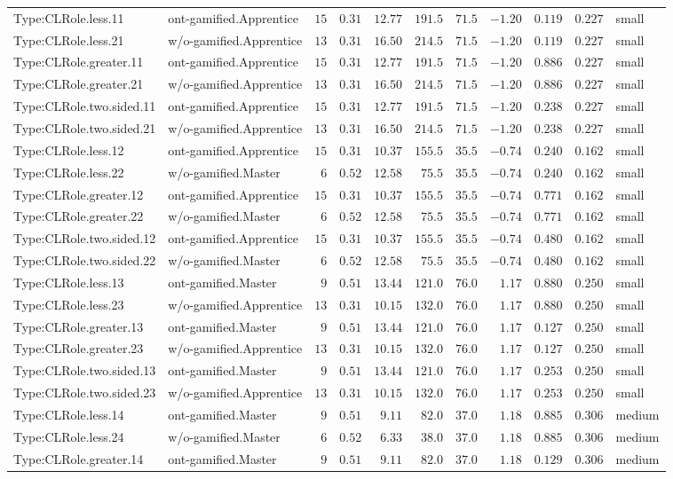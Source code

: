 \documentclass[6pt,a4paper]{article}
\begin{document}
{\begin{longtable}{llrrrrrrrrl}
Type:CLRole.less.11&ont-gamified.Apprentice&$15$&$0.31$&$12.77$&$191.5$&$ 71.5$&$-1.20$&$0.119$&$0.227$&small\tabularnewline
Type:CLRole.less.21&w/o-gamified.Apprentice&$13$&$0.31$&$16.50$&$214.5$&$ 71.5$&$-1.20$&$0.119$&$0.227$&small\tabularnewline
Type:CLRole.greater.11&ont-gamified.Apprentice&$15$&$0.31$&$12.77$&$191.5$&$ 71.5$&$-1.20$&$0.886$&$0.227$&small\tabularnewline
Type:CLRole.greater.21&w/o-gamified.Apprentice&$13$&$0.31$&$16.50$&$214.5$&$ 71.5$&$-1.20$&$0.886$&$0.227$&small\tabularnewline
Type:CLRole.two.sided.11&ont-gamified.Apprentice&$15$&$0.31$&$12.77$&$191.5$&$ 71.5$&$-1.20$&$0.238$&$0.227$&small\tabularnewline
Type:CLRole.two.sided.21&w/o-gamified.Apprentice&$13$&$0.31$&$16.50$&$214.5$&$ 71.5$&$-1.20$&$0.238$&$0.227$&small\tabularnewline
Type:CLRole.less.12&ont-gamified.Apprentice&$15$&$0.31$&$10.37$&$155.5$&$ 35.5$&$-0.74$&$0.240$&$0.162$&small\tabularnewline
Type:CLRole.less.22&w/o-gamified.Master&$ 6$&$0.52$&$12.58$&$ 75.5$&$ 35.5$&$-0.74$&$0.240$&$0.162$&small\tabularnewline
Type:CLRole.greater.12&ont-gamified.Apprentice&$15$&$0.31$&$10.37$&$155.5$&$ 35.5$&$-0.74$&$0.771$&$0.162$&small\tabularnewline
Type:CLRole.greater.22&w/o-gamified.Master&$ 6$&$0.52$&$12.58$&$ 75.5$&$ 35.5$&$-0.74$&$0.771$&$0.162$&small\tabularnewline
Type:CLRole.two.sided.12&ont-gamified.Apprentice&$15$&$0.31$&$10.37$&$155.5$&$ 35.5$&$-0.74$&$0.480$&$0.162$&small\tabularnewline
Type:CLRole.two.sided.22&w/o-gamified.Master&$ 6$&$0.52$&$12.58$&$ 75.5$&$ 35.5$&$-0.74$&$0.480$&$0.162$&small\tabularnewline
Type:CLRole.less.13&ont-gamified.Master&$ 9$&$0.51$&$13.44$&$121.0$&$ 76.0$&$ 1.17$&$0.880$&$0.250$&small\tabularnewline
Type:CLRole.less.23&w/o-gamified.Apprentice&$13$&$0.31$&$10.15$&$132.0$&$ 76.0$&$ 1.17$&$0.880$&$0.250$&small\tabularnewline
Type:CLRole.greater.13&ont-gamified.Master&$ 9$&$0.51$&$13.44$&$121.0$&$ 76.0$&$ 1.17$&$0.127$&$0.250$&small\tabularnewline
Type:CLRole.greater.23&w/o-gamified.Apprentice&$13$&$0.31$&$10.15$&$132.0$&$ 76.0$&$ 1.17$&$0.127$&$0.250$&small\tabularnewline
Type:CLRole.two.sided.13&ont-gamified.Master&$ 9$&$0.51$&$13.44$&$121.0$&$ 76.0$&$ 1.17$&$0.253$&$0.250$&small\tabularnewline
Type:CLRole.two.sided.23&w/o-gamified.Apprentice&$13$&$0.31$&$10.15$&$132.0$&$ 76.0$&$ 1.17$&$0.253$&$0.250$&small\tabularnewline
Type:CLRole.less.14&ont-gamified.Master&$ 9$&$0.51$&$ 9.11$&$ 82.0$&$ 37.0$&$ 1.18$&$0.885$&$0.306$&medium\tabularnewline
Type:CLRole.less.24&w/o-gamified.Master&$ 6$&$0.52$&$ 6.33$&$ 38.0$&$ 37.0$&$ 1.18$&$0.885$&$0.306$&medium\tabularnewline
Type:CLRole.greater.14&ont-gamified.Master&$ 9$&$0.51$&$ 9.11$&$ 82.0$&$ 37.0$&$ 1.18$&$0.129$&$0.306$&medium\tabularnewline

\end{longtable}}
\end{document}
